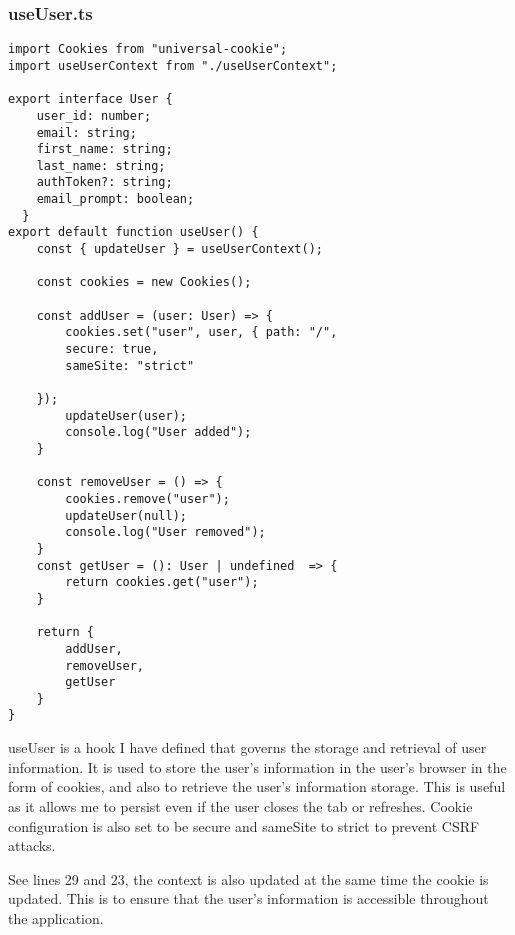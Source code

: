 \subsubsection{useUser.ts}
\begin{verbatim}
import Cookies from "universal-cookie";
import useUserContext from "./useUserContext";

export interface User {
    user_id: number;
    email: string;
    first_name: string;
    last_name: string;
    authToken?: string;
    email_prompt: boolean;
  }
export default function useUser() {
    const { updateUser } = useUserContext();

    const cookies = new Cookies();

    const addUser = (user: User) => {
        cookies.set("user", user, { path: "/",
        secure: true,
        sameSite: "strict"

    });
        updateUser(user);
        console.log("User added");
    }

    const removeUser = () => {
        cookies.remove("user");
        updateUser(null);
        console.log("User removed");
    }
    const getUser = (): User | undefined  => {
        return cookies.get("user");
    }

    return {
        addUser,
        removeUser,
        getUser
    }
}
\end{verbatim}
useUser is a hook I have defined that governs the storage and retrieval of user information. It is used to store the user's information in the user's browser in the form of cookies, and also to retrieve the user's information storage. This is useful as it allows me to persist even if the user closes the tab or refreshes. Cookie configuration is also set to be secure and sameSite to strict to prevent CSRF attacks.

See lines 29 and 23, the context is also updated at the same time the cookie is updated. This is to ensure that the user's information is accessible throughout the application.


